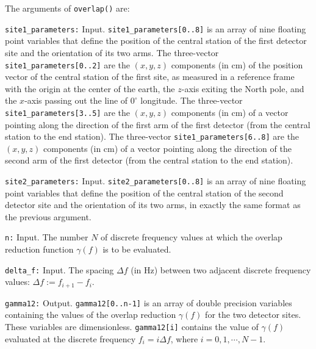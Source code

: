 The arguments of {\tt overlap()} are:
\begin{description}
%
\item{\tt site1\_parameters:} Input.  
{\tt site1\_parameters[0..8]} is an array of nine floating point variables
that define the position of the central station of the first detector site 
and the orientation of its two arms.  
The three-vector {\tt site1\_parameters[0..2]} are the $(x,y,z)$ components 
(in cm) of the position vector of the central station of the first site, 
as measured in a reference frame with the origin at the center of the earth, 
the $z$-axis exiting the North pole, and the $x$-axis passing out the line 
of $0^\circ$ longitude.  
The three-vector {\tt site1\_parameters[3..5]} are the $(x,y,z)$ 
components (in cm) of a vector pointing along the direction of the 
first arm of the first detector 
(from the central station to the end station).   
The three-vector {\tt site1\_parameters[6..8]} are the $(x,y,z)$ 
components (in cm) of a vector pointing along the direction of the 
second arm of the first detector
(from the central station to the end station).
%
\item{\tt site2\_parameters:} Input.  
{\tt site2\_parameters[0..8]} is an array of nine floating point variables
that define the position of the central station of the second detector site 
and the orientation of its two arms,
in exactly the same format as the previous argument.
%
\item{\tt n:} Input.
The number $N$ of discrete frequency values at which the overlap 
reduction function $\gamma(f)$ is to be evaluated.
%
\item{\tt delta\_f:} Input.
The spacing $\Delta f$ (in Hz) between two adjacent discrete frequency
values: $\Delta f:=f_{i+1}-f_i$.  
%
\item{\tt gamma12:} Output.
{\tt gamma12[0..n-1]} is an array of double precision variables containing 
the values of the overlap reduction $\gamma(f)$ for the two detector sites.
These variables are dimensionless.
{\tt gamma12[i]} contains the value of $\gamma(f)$ evaluated at the discrete
frequency $f_i=i\Delta f$, where $i=0,1,\cdots,N-1$.
\end{description}

